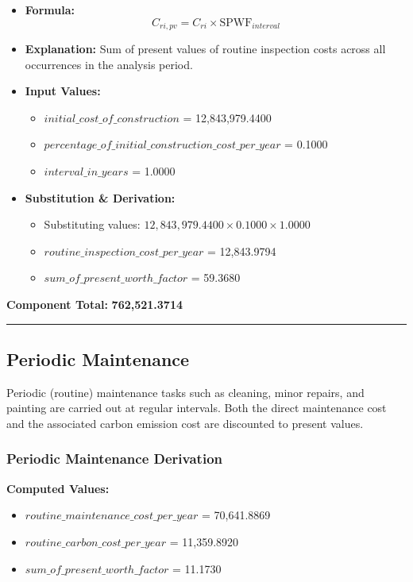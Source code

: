 \documentclass[12pt,a4paper]{article}
\begin{document}
\begin{itemize}
  \item \textbf{Formula:} $$C_{ri,pv} = C_{ri} \times \text{SPWF}_{interval}$$
  \item \textbf{Explanation:} Sum of present values of routine inspection costs across all occurrences in the analysis period.
  \item \textbf{Input Values:}
  \begin{itemize}
    \item $initial\_cost\_of\_construction$ = 12,843,979.4400
    \item $percentage\_of\_initial\_construction\_cost\_per\_year$ = 0.1000
    \item $interval\_in\_years$ = 1.0000
  \end{itemize}
  \item \textbf{Substitution \& Derivation:}
  \begin{itemize}
    \item Substituting values: $12,843,979.4400 \times 0.1000 \times 1.0000$
    \item $routine\_inspection\_cost\_per\_year$ = 12,843.9794
    \item $sum\_of\_present\_worth\_factor$ = 59.3680
  \end{itemize}
\end{itemize}


\textbf{Component Total:} \textbf{\Large 762,521.3714}


\medskip\hrule\medskip


\subsection{Periodic Maintenance}

Periodic (routine) maintenance tasks such as cleaning, minor repairs, and painting are carried out at regular intervals. Both the direct maintenance cost and the associated carbon emission cost are discounted to present values.


\subsubsection{Periodic Maintenance Derivation}

\textbf{Computed Values:}

\begin{itemize}
  \item $routine\_maintenance\_cost\_per\_year$ = 70,641.8869
  \item $routine\_carbon\_cost\_per\_year$ = 11,359.8920
  \item $sum\_of\_present\_worth\_factor$ = 11.1730
\end{itemize}
\end{document}
